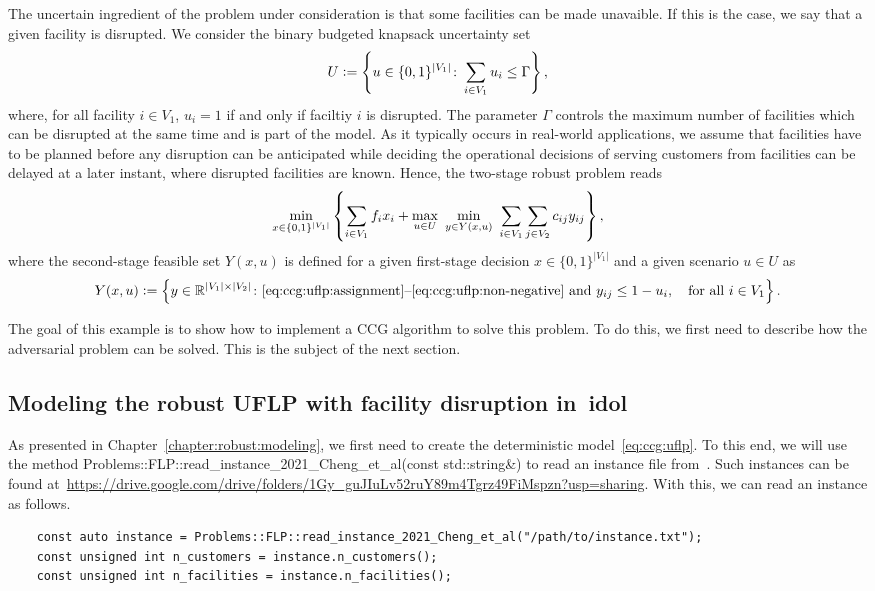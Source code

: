 The uncertain ingredient of the problem under consideration is that some
facilities can be made unavaible. If this is the case, we say that a given
facility is disrupted.
We consider the binary budgeted knapsack uncertainty set 
\begin{equation*}
    U \mathrel{{\mathop:}{=}} \left\{ u\in\{0,1\}^{|V_1|} \colon \sum_{i\in V_1} u_i \le \Gamma \right\},
\end{equation*}
where, for all facility $i\in V_1$, $u_i = 1$ if and only if faciltiy $i$ is
disrupted. The parameter $\Gamma$ controls the maximum number of facilities
which can be disrupted at the same time and is part of the model. As it
typically occurs in real-world applications, we assume that facilities have to
be planned before any disruption can be anticipated while deciding the
operational decisions of serving customers from facilities can be delayed at a
later instant, where disrupted facilities are known. Hence, the two-stage
robust problem reads 
\begin{equation*}
    \min_{x\in\{0,1\}^{|V_1|}} \Set{
        \sum_{i\in V_1} f_ix_i +
        \max_{u\in U} \ 
        \min_{ y\in Y(x,u) } \ 
        \sum_{i\in V_1} \sum_{j\in V_2} c_{ij} y_{ij}
    },
\end{equation*}
where the second-stage feasible set $Y(x,u)$ is defined for a given
first-stage decision $x\in\{0,1\}^{|V_1|}$ and a given scenario $u\in U$ as
\begin{equation*}
    Y(x,u) \mathrel{{\mathop:}{=}} \left\{ y\in\mathbb{R}^{|V_1|\times|V_2|} \colon
    \text{\eqref{eq:ccg:uflp:assignment}--\eqref{eq:ccg:uflp:non-negative} and }
    y_{ij} \le 1 - u_i, \quad \text{for all }i\in V_1 \right\}.
\end{equation*}

The goal of this example is to show how to implement a CCG algorithm to solve
this problem. To do this, we first need to describe how the adversarial
problem can be solved. This is the subject of the next section.

\subsection{Modeling the robust UFLP with facility disruption in~\textsf{idol}}

As presented in Chapter~\ref{chapter:robust:modeling}, we first need to create
the deterministic model~\eqref{eq:ccg:uflp}. To this end, we will use the
method \textsf{Problems::FLP::read\_instance\_2021\_Cheng\_et\_al(const
std::string\&)} to read an instance file from~\textcite{Cheng2021}. Such
instances can be found
at~\url{https://drive.google.com/drive/folders/1Gy_guJIuLv52ruY89m4Tgrz49FiMspzn?usp=sharing}.
With this, we can read an instance as follows. 
%
\begin{lstlisting}
    const auto instance = Problems::FLP::read_instance_2021_Cheng_et_al("/path/to/instance.txt");
    const unsigned int n_customers = instance.n_customers();
    const unsigned int n_facilities = instance.n_facilities();
\end{lstlisting}

